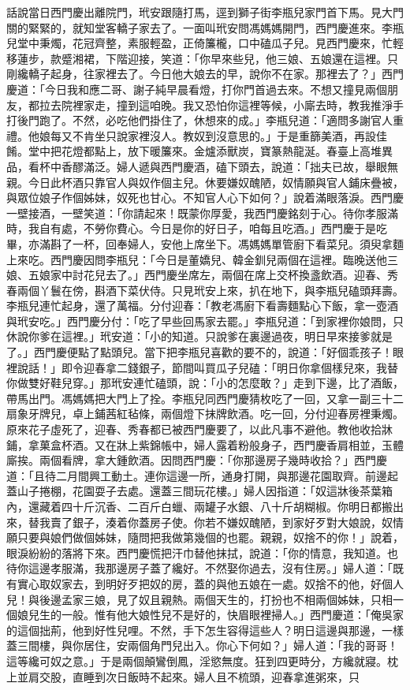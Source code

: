 \begin{showcontents}{}
話說當日西門慶出離院門，玳安跟隨打馬，逕到獅子街李瓶兒家門首下馬。見大門關的緊緊的，就知堂客轎子家去了。一面叫玳安問馮媽媽開門，西門慶進來。李瓶兒堂中秉燭，花冠齊整，素服輕盈，正倚簾櫳，口中磕瓜子兒。見西門慶來，忙輕移蓮步，款蹙湘裙，下階迎接，笑道：「你早來些兒，他三娘、五娘還在這裡。只剛纔轎子起身，往家裡去了。今日他大娘去的早，說你不在家。那裡去了？」西門慶道：「今日我和應二哥、謝子純早晨看燈，打你門首過去來。不想又撞見兩個朋友，都拉去院裡家走，撞到這咱晚。我又恐怕你這裡等候，小廝去時，教我推淨手打後門跑了。不然，必吃他們掛住了，休想來的成。」李瓶兒道：「適問多謝官人重禮。他娘每又不肯坐只說家裡沒人。教奴到沒意思的。」于是重篩美酒，再設佳餚。堂中把花燈都點上，放下暖簾來。金爐添獸炭，寶篆熱龍涎。春臺上高堆異品，看杯中香醪滿泛。婦人遞與西門慶酒，磕下頭去，說道：「拙夫已故，舉眼無親。今日此杯酒只靠官人與奴作個主兒。休要嫌奴醜陋，奴情願與官人鋪床疊被，與眾位娘子作個姊妹，奴死也甘心。不知官人心下如何？」說着滿眼落淚。西門慶一壁接酒，一壁笑道：「你請起來！既蒙你厚愛，我西門慶銘刻于心。待你孝服滿時，我自有處，不勞你費心。今日是你的好日子，咱每且吃酒。」西門慶于是吃畢，亦滿斟了一杯，回奉婦人，安他上席坐下。馮媽媽單管廚下看菜兒。須臾拿麵上來吃。西門慶因問李瓶兒：「今日是董嬌兒、韓金釧兒兩個在這裡。臨晚送他三娘、五娘家中討花兒去了。」西門慶坐席左，兩個在席上交杯換盞飲酒。迎春、秀春兩個丫鬟在傍，斟酒下菜伏侍。只見玳安上來，扒在地下，與李瓶兒磕頭拜壽。李瓶兒連忙起身，還了萬福。分付迎春：「教老馮廚下看壽麵點心下飯，拿一壺酒與玳安吃。」西門慶分付：「吃了早些回馬家去罷。」李瓶兒道：「到家裡你娘問，只休說你爹在這裡。」玳安道：「小的知道。只說爹在裏邊過夜，明日早來接爹就是了。」西門慶便點了點頭兒。當下把李瓶兒喜歡的要不的，說道：「好個乖孩子！眼裡說話！」即令迎春拿二錢銀子，節間叫買瓜子兒磕：「明日你拿個樣兒來，我替你做雙好鞋兒穿。」那玳安連忙磕頭，說：「小的怎麼敢？」走到下邊，比了酒飯，帶馬出門。馮媽媽把大門上了拴。李瓶兒同西門慶猜枚吃了一回，又拿一副三十二扇象牙牌兒，卓上鋪茜紅毡條，兩個燈下抹牌飲酒。吃一回，分付迎春房裡秉燭。原來花子虛死了，迎春、秀春都已被西門慶要了，以此凡事不避他。教他收拾牀鋪，拿菓盒杯酒。又在牀上紫錦帳中，婦人露着粉般身子，西門慶香肩相並，玉體廝挨。兩個看牌，拿大鍾飲酒。因問西門慶：「你那邊房子幾時收拾？」西門慶道：「且待二月間興工動土。連你這邊一所，通身打開，與那邊花園取齊。前邊起蓋山子捲棚，花園耍子去處。還蓋三間玩花樓。」婦人因指道：「奴這牀後茶葉箱內，還藏着四十斤沉香、二百斤白蠟、兩罐子水銀、八十斤胡糊椒。你明日都搬出來，替我賣了銀子，湊着你蓋房子使。你若不嫌奴醜陋，到家好歹對大娘說，奴情願只要與娘們做個姊妹，隨問把我做第幾個的也罷。親親，奴捨不的你！」說着，眼淚紛紛的落將下來。西門慶慌把汗巾替他抹拭，說道：「你的情意，我知道。也待你這邊孝服滿，我那邊房子蓋了纔好。不然娶你過去，沒有住房。」婦人道：「既有實心取奴家去，到明好歹把奴的房，蓋的與他五娘在一處。奴捨不的他，好個人兒！與後邊孟家三娘，見了奴且親熱。兩個天生的，打扮也不相兩個姊妹，只相一個娘兒生的一般。惟有他大娘性兒不是好的，快眉眼裡掃人。」西門慶道：「俺吳家的這個拙荊，他到好性兒哩。不然，手下怎生容得這些人？明日這邊與那邊，一樣蓋三間樓，與你居住，安兩個角門兒出入。你心下何如？」婦人道：「我的哥哥！這等纔可奴之意。」于是兩個顛鸞倒鳳，淫慾無度。狂到四更時分，方纔就寢。枕上並肩交股，直睡到次日飯時不起來。婦人且不梳頭，迎春拿進粥來，只
\end{showcontents}
